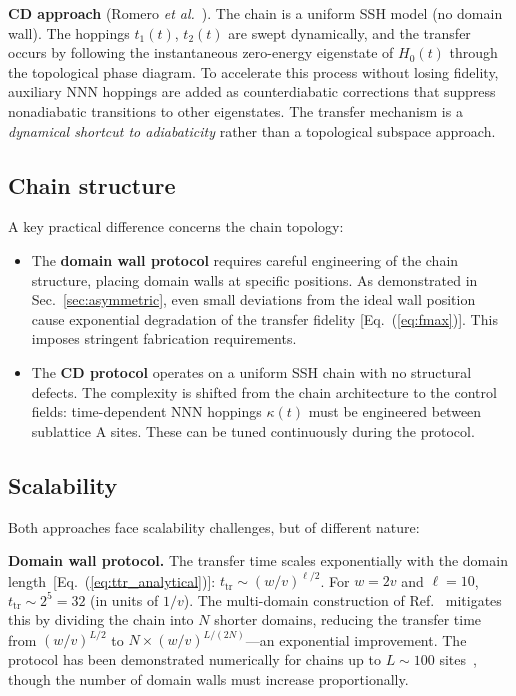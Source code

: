 \documentclass[
  reprint,
  amsmath,
  amssymb,
  aps,
  prb,
  longbibliography,
]{revtex4-2}
\newcommand{\ttr}{t_{\mathrm{tr}}}
\begin{document}
\textbf{CD approach} (Romero \textit{et al.}~\cite{Romero2024}).
The chain is a uniform SSH model (no domain wall). The hoppings $t_1(t)$,
$t_2(t)$ are swept dynamically, and the transfer occurs by following the
instantaneous zero-energy eigenstate of $H_0(t)$ through the topological
phase diagram. To accelerate this process without losing fidelity, auxiliary
NNN hoppings are added as counterdiabatic corrections that suppress
nonadiabatic transitions to other eigenstates. The transfer mechanism is
a \emph{dynamical shortcut to adiabaticity} rather than a topological
subspace approach.

\subsection{Chain structure}
\label{sec:comp_structure}

A key practical difference concerns the chain topology:

\begin{itemize}
  \item The \textbf{domain wall protocol} requires careful engineering of the
    chain structure, placing domain walls at specific positions. As demonstrated
    in Sec.~\ref{sec:asymmetric}, even small deviations from the ideal wall
    position cause exponential degradation of the transfer fidelity
    [Eq.~(\ref{eq:fmax})]. This imposes stringent fabrication requirements.
  \item The \textbf{CD protocol} operates on a uniform SSH chain with no
    structural defects. The complexity is shifted from the chain architecture
    to the control fields: time-dependent NNN hoppings $\kappa(t)$ must be
    engineered between sublattice A sites. These can be tuned continuously
    during the protocol.
\end{itemize}

\subsection{Scalability}
\label{sec:comp_scalability}

Both approaches face scalability challenges, but of different nature:

\textbf{Domain wall protocol.}
The transfer time scales exponentially with the domain
length~[Eq.~(\ref{eq:ttr_analytical})]:
$\ttr \sim (w/v)^{\ell/2}$. For $w = 2v$ and $\ell = 10$,
$\ttr \sim 2^5 = 32$ (in units of $1/v$). The multi-domain construction
of Ref.~\cite{Zurita2023} mitigates this by dividing the chain into
$N$ shorter domains, reducing the transfer time from
$(w/v)^{L/2}$ to $N \times (w/v)^{L/(2N)}$---an exponential improvement.
The protocol has been demonstrated numerically for chains up to
$L \sim 100$ sites~\cite{Zurita2023}, though the number of domain walls
must increase proportionally.
\end{document}
